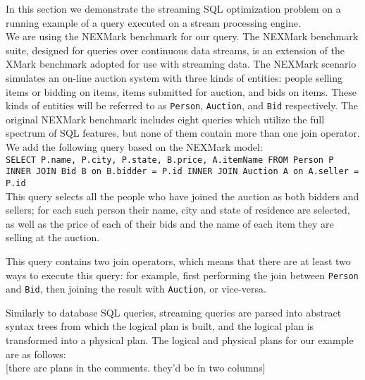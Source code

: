 \label {sec:fs-optimization-example}

In this section we demonstrate the streaming SQL optimization problem on a running example of a query executed on a stream processing engine. \\


We are using the NEXMark benchmark \cite{tucker2008nexmark} for our query. The NEXMark benchmark suite, designed for queries over continuous data streams, is an extension of the XMark benchmark \cite{schmidt2002xmark} adopted for use with streaming data. The NEXMark scenario simulates an on-line auction system with three kinds of entities: people selling items or bidding on items, items submitted for auction, and bids on items. These kinds of entities will be referred to as \texttt{Person}, \texttt{Auction}, and \texttt{Bid} respectively. The original NEXMark benchmark includes eight queries which utilize the full spectrum of SQL features, but none of them contain more than one join operator. We add the following query based on the NEXMark model: \\

\texttt{SELECT P.name, P.city, P.state, B.price, A.itemName FROM Person P INNER JOIN Bid B on B.bidder = P.id INNER JOIN Auction A on A.seller = P.id} \\

This query selects all the people who have joined the auction as both bidders and sellers; for each such person their name, city and state of residence are selected, as well as the price of each of their bids and the name of each item they are selling at the auction. 

This query contains two join operators, which means that there are at least two ways to execute this query: for example, first performing the join between \texttt{Person} and \texttt{Bid}, then joining the result with \texttt{Auction}, or vice-versa. 

Similarly to database SQL queries, streaming queries are parsed into abstract syntax trees from which the logical plan is built, and the logical plan is transformed into a physical plan. The logical and physical plans for our example are as follows: \\

[there are plans in the comments. they'd be in two columns]


